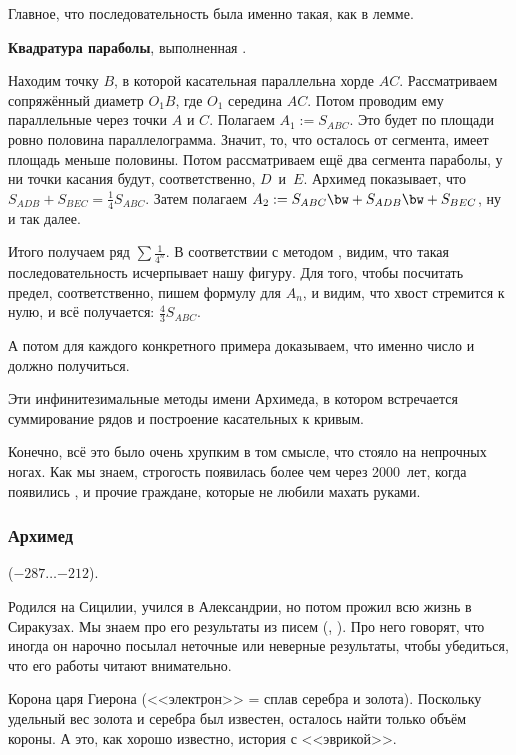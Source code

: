 \documentclass[a4paper,oneside,fleqn,10pt]{article}
\newcommand{\pe}[2]{${#1}\ldots{#2}$}
\newcommand{\cpic}[1]{$$\epsfbox{pictures.#1}$$}
\begin{document}
Главное, что последовательность была именно такая, как в лемме.

\textbf{Квадратура параболы}, выполненная .

Находим точку $B$, в которой касательная параллельна хорде $AC$.
Рассматриваем сопряжённый диаметр $O_1B$, где $O_1$ середина $AC$. Потом проводим ему параллельные
через точки $A$ и $C$. Полагаем $A_1 := S_{ABC}$. Это будет по площади
ровно половина параллелограмма. Значит, то, что осталось от сегмента, имеет
площадь меньше половины. Потом рассматриваем ещё два сегмента параболы,
у ни точки касания будут, соответственно, $D$~и~$E$. Архимед показывает,
что  $S_{ADB} + S_{BEC} = \frac14 S_{ABC}$.
Затем полагаем $A_2 := S_{ABC} \bw+ S_{ADB} \bw+ S_{BEC}$, ну и так далее.


Итого получаем ряд $\sum\frac{1}{4^n}$. В соответствии с методом , видим,
что такая последовательность исчерпывает нашу фигуру. Для того, чтобы посчитать предел,
соответственно, пишем формулу для $A_n$, и видим, что хвост стремится к нулю,
и всё получается: $\frac43S_{ABC}$.

А потом для каждого конкретного примера доказываем, что именно число и должно получиться.

Эти инфинитезимальные методы имени Архимеда, в котором встречается суммирование рядов
и построение касательных к кривым.

Конечно, всё это было очень хрупким в том смысле, что стояло на непрочных ногах.
Как мы знаем, строгость появилась более чем через 2000~лет, когда появились ,
 и прочие граждане, которые не любили махать руками.

\subsubsection{Архимед}

 (\pe{-287}{-212}).

Родился на Сицилии, учился в Александрии, но потом прожил всю жизнь в Сиракузах.
Мы знаем про его результаты из писем (, ). Про него говорят, что иногда
он нарочно посылал неточные или неверные результаты, чтобы убедиться, что его работы
читают внимательно.

Корона царя Гиерона (<<электрон>> = сплав серебра и золота). Поскольку удельный вес золота и серебра
был известен, осталось найти только объём короны. А это, как хорошо известно, история с <<эврикой>>.
\end{document}
